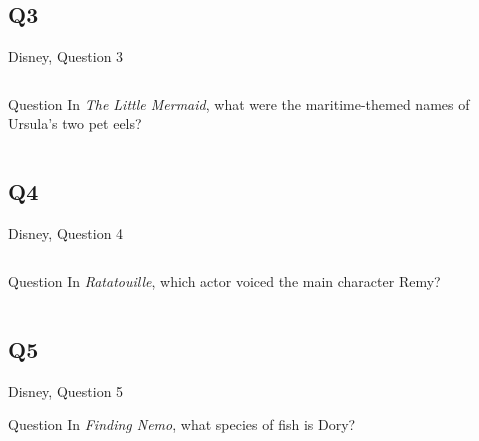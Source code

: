 \documentclass[11pt]{beamer}
\begin{document}
\subsection*{Q3}
\begin{frame}[t]{Disney, Question 3}
\begin{columns}[T,totalwidth=\linewidth]
\begin{column}{0.32\linewidth}
\begin{block}{Question}
In \emph{The Little Mermaid}, what were the maritime-themed names of Ursula's two pet eels?
\end{block}
\end{column}
\begin{column}{0.65\linewidth}
\begin{center}
\texttt{[image: \{Images/flotsamjetsam]}.jpg}
\end{center}
\end{column}
\end{columns}
\end{frame}
\subsection*{Q4}
\begin{frame}[t]{Disney, Question 4}
\begin{columns}[T,totalwidth=\linewidth]
\begin{column}{0.32\linewidth}
\begin{block}{Question}
In \emph{Ratatouille}, which actor voiced the main character Remy?
\end{block}
\end{column}
\begin{column}{0.65\linewidth}
\begin{center}
\texttt{[image: \{Images/remy]}.jpg}
\end{center}
\end{column}
\end{columns}
\end{frame}
\subsection*{Q5}
\begin{frame}[t]{Disney, Question 5}
\begin{block}{Question}
In \emph{Finding Nemo}, what species of fish is Dory?
\end{block}
\end{frame}
\end{document}
